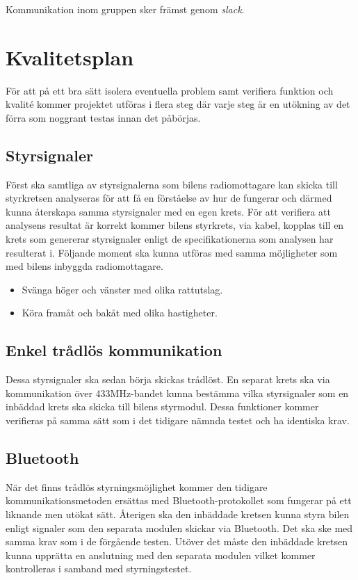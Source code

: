 \documentclass[a4paper]{article}
\begin{document}
\vspace{5mm}
\noindent Kommunikation inom gruppen sker främst genom {\it slack}.

\newpage
\section{Kvalitetsplan}
För att på ett bra sätt isolera eventuella problem samt verifiera funktion och kvalité kommer projektet utföras i flera steg där varje steg är en utökning av det förra som noggrant testas innan det påbörjas. 

\subsection{Styrsignaler}
Först ska samtliga av styrsignalerna som bilens radiomottagare kan skicka till styrkretsen analyseras för att få en förståelse av hur de fungerar och därmed kunna återskapa samma styrsignaler med en egen krets. För att verifiera att analysens resultat är korrekt kommer bilens styrkrets, via kabel, kopplas till en krets som genererar styrsignaler enligt de specifikationerna som analysen har resulterat i. Följande moment ska kunna utföras med samma möjligheter som med bilens inbyggda radiomottagare.
\begin{itemize}  
    \item Svänga höger och vänster med olika rattutslag.
    \item Köra framåt och bakåt med olika hastigheter.
\end{itemize}

\subsection{Enkel trådlös kommunikation}
Dessa styrsignaler ska sedan börja skickas trådlöst. En separat krets ska via kommunikation över 433MHz-bandet kunna bestämma vilka styrsignaler som en inbäddad krets ska skicka till bilens styrmodul. Dessa funktioner kommer verifieras på samma sätt som i det tidigare nämnda testet och ha identiska krav.  

\subsection{Bluetooth}
När det finns trådlös styrningsmöjlighet kommer den tidigare kommunikationsmetoden ersättas med Bluetooth-protokollet som fungerar på ett liknande men utökat sätt. Återigen ska den inbäddade kretsen kunna styra bilen enligt signaler som den separata modulen skickar via Bluetooth. Det ska ske med samma krav som i de förgående testen. Utöver det måste den inbäddade kretsen kunna upprätta en anslutning med den separata modulen vilket kommer kontrolleras i samband med styrningstestet.
\end{document}
